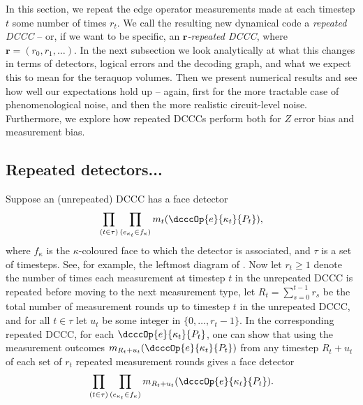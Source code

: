 In this section, we repeat the edge operator measurements made at each timestep $t$ some number of times $r_t$.
We call the resulting new dynamical code a \textit{repeated DCCC} --
or, if we want to be specific, an \emph{$\mathbf{r}$-repeated DCCC}, where $\mathbf{r} = (r_0, r_1, \ldots)$.
In the next subsection we look analytically at what this changes in terms of detectors, logical errors and the decoding graph, and what we expect this to mean for the teraquop volumes.
Then we present numerical results and see how well our expectations hold up -- again, first for the more tractable case of phenomenological noise, and then the more realistic circuit-level noise.
Furthermore, we explore how repeated DCCCs perform both for $Z$ error bias and measurement bias.

\subsection{Repeated detectors...}\label{subsec:repeating_measurements_detectors}

Suppose an (unrepeated) DCCC has a face detector
\begin{equation}\label{eq:unrepeated_detector}
\prod_{(t \in \tau)}
\prod_{(e_{\kappa_t} \in f_{\kappa})}
m_t(\dcccOp{e}{\kappa_t}{P_t}),
\end{equation}
where $f_\kappa$ is the $\kappa$-coloured face to which the detector is associated,
and $\tau$ is a set of timesteps.
See, for example, the leftmost diagram of .
Now let $r_t \geq 1$ denote the number of times each measurement at timestep $t$ in the unrepeated DCCC is repeated before moving to the next measurement type,
let $R_t = \sum_{s=0}^{t-1} r_s$ be the total number of measurement rounds up to timestep $t$ in the unrepeated DCCC,
and for all $t \in \tau$ let $u_t$ be some integer in $\{0, \ldots, r_t-1\}$.
In the corresponding repeated DCCC, for each $\dcccOp{e}{\kappa_t}{P_t}$,
one can show that using the measurement outcomes $m_{R_t + u_t}(\dcccOp{e}{\kappa_{t}}{P_{t}})$ from
any timestep $R_t + u_t$ of each set of $r_t$ repeated measurement rounds gives a face detector
\begin{equation}\label{eq:repeated_detector_using_first_round_measurements}
\prod_{(t \in \tau)}
\prod_{(e_{\kappa_{t}} \in f_{\kappa})}
m_{R_t + u_t}(\dcccOp{e}{\kappa_{t}}{P_{t}}).
\end{equation}

